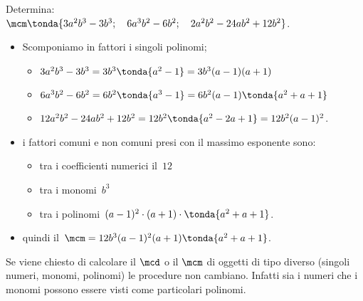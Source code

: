 
\begin{esempio}{}{}
Determina:\\
\(\mcm \tonda{3a^{2}b^{3}-3b^{3};\quad 6a^{3}b^{2}-6b^{2};
            \quad 2a^{2}b^{2}-24ab^{2}+12b^{2}} \).
\begin{itemize}[nosep]
\item Scomponiamo in fattori i singoli polinomi;
\begin{itemize}[nosep]
\item \(3a^{2}b^{3}-3b^{3}=3b^{3} \tonda{a^{2}-1} =3b^{3}(a-1)(a+1)\)
\item \(6a^{3}b^{2}-6b^{2}=6b^{2} \tonda{a^{3}-1} =
        6b^{2}(a-1) \tonda{a^{2}+a+1} \)
\item \(12a^{2}b^{2}-24ab^{2}+12b^{2}=12b^{2} \tonda{a^{2}-2a+1} =
        12b^{2}(a-1)^{2}\).
\end{itemize}
\item i fattori comuni e non comuni presi con il massimo esponente sono:
\begin{itemize}[nosep]
\item tra i coefficienti numerici il~\(12\)
\item tra i monomi~\(b^{3}\)
\item tra i polinomi~\((a-1)^{2}\cdot (a+1)\cdot  \tonda{a^{2}+a+1} \).
\end{itemize}
\item quindi il~\(\mcm=12b^{3}(a-1)^{2}(a+1) \tonda{a^{2}+a+1} \).
\end{itemize}
\end{esempio}

\begin{osservazione}{}{}
Se viene chiesto di calcolare il \(\mcd\) o il \(\mcm\) di 
oggetti di tipo diverso (singoli numeri, monomi, polinomi) le procedure  
non cambiano. Infatti sia i numeri che i monomi possono essere visti come 
particolari polinomi.
\end{osservazione}


